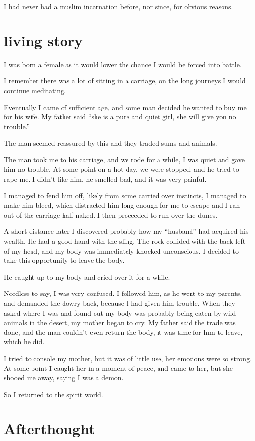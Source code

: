 I had never had a muslim incarnation before, nor since, for obvious reasons.

\section{living story}
I was born a female as it would lower the chance I would be forced into battle. 

I remember there was a lot of sitting in a carriage, on the long journeys I 
would continue meditating. 

Eventually I came of sufficient age, and some man decided he wanted to buy me
for his wife. My father said ``she is a pure and quiet girl, she will give you no
trouble.''

The man seemed reassured by this and they traded sums and animals.

The man took me to his carriage, and we rode for a while, I was quiet and gave
him no trouble. At some point on a hot day, we were stopped, and he tried to 
rape me. I didn't like him, he smelled bad, and it was very painful. 

I managed to fend him off, likely from some carried over instincts, I managed to
make him bleed, which distracted him long enough for me to escape and I ran out 
of the carriage half naked. I then proceeded to run over the dunes. 

A short distance later I discovered probably how my ``husband'' had acquired his
wealth. He had a good hand with the sling. The rock collided with the back left
of my head, and my body was immediately knocked unconscious. I decided to take
this opportunity to leave the body.

He caught up to my body and cried over it for a while.

Needless to say, I was very confused. I followed him, as he went to my parents,
and demanded the dowry back, because I had given him trouble. When they asked
where I was and found out my body was probably being eaten by wild animals in
the desert, my mother began to cry. My father said the trade was done, and the
man couldn't even return the body, it was time for him to leave, which he did.

I tried to console my mother, but it was of little use, her emotions were so
strong. At some point I caught her in a moment of peace, and came to her, but
she shooed me away, saying I was a demon.

So I returned to the spirit world.

\section{Afterthought}

